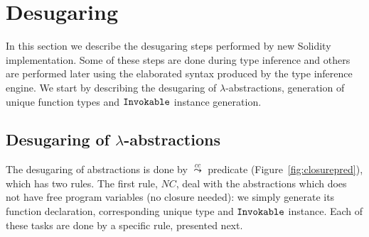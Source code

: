 \documentclass[a4paper, 11pt]{article}
\begin{document}
\section{Desugaring}\label{sec:desugar} 

In this section we describe the desugaring steps performed by new 
Solidity implementation. Some of these steps are done during type inference 
and others are performed later using the elaborated syntax produced by 
the type inference engine. We start by describing the desugaring 
of $\lambda$-abstractions, generation of unique function types and 
$\mathtt{Invokable}$ instance generation.

\subsection{Desugaring of $\lambda$-abstractions}

The desugaring of abstractions is done by $\overset{cc}{\leadsto}$ predicate (Figure~\ref{fig:closurepred}), 
which has two rules. The first rule, $NC$, deal with the abstractions which does not 
have free program variables (no closure needed): we simply generate its 
function declaration, corresponding unique type and $\mathtt{Invokable}$ instance. Each of these 
tasks are done by a specific rule, presented next. 
\end{document}
